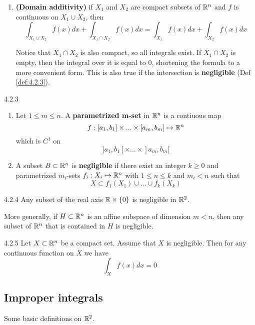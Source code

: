 \begin{enumerate}
    \item \textbf{(Domain additivity)} if $X_1$ and $X_2$ are compact subsets of $\mathbb{R}^n$ and $f$ is continuous on $X_1 \cup X_2$, then
          \[ \int_{X_1 \cup X_2} f(x)dx + \int_{X_1 \cap X_2} f(x)dx = \int_{X_1} f(x) dx + \int_{X_2} f(x)dx \]

          Notice that $X_1 \cap X_2$ is also compact, so all integrals exist.
          If $X_1 \cap X_2$ is empty, then the integral over it is equal to $0$,
          shortening the formula to a more convenient form.
          This is also true if the intersection is \textbf{negligible} (Def \ref{def:4.2.3}).
\end{enumerate}

\begin{definition}{4.2.3}
    \label{def:4.2.3}
    \begin{enumerate}
        \item Let $1 \le m \le n$. A \textbf{parametrized m-set} in $\mathbb{R}^n$ is a contiuous map
              \[ f: [a_1, b_1] \times ... \times [a_m, b_m] \mapsto \mathbb{R}^n \]
              which is $C^1$ on
              \[ ]a_1, b_1[ \times ... \times ]a_m, b_m[ \]
        \item A subset $B \subset \mathbb{R}^n$ is \textbf{negligible} if there exist an integer $k \ge 0$ and parametrized
              $m_i$-sets $f_i: X_i \mapsto \mathbb{R}^n$ with $1 \le n \le k$ and $m_i < n$ such that
              \[ X \subset f_1(X_1) \cup ... \cup f_k(X_k) \]
    \end{enumerate}
\end{definition}

\begin{example}{4.2.4}
    Any subset of the real axis $\mathbb{R} \times \{0\}$ is negligible in $\mathbb{R}^2$.

    More generally, if $H \subset \mathbb{R}^n$ is an affine subspace of dimension $m < n$, then any subset of $\mathbb{R}^n$ that is contained in $H$ is negligible.
\end{example}

\begin{proposition}{4.2.5}
    Let $X \subset \mathbb{R}^n$ be a compact set. Assume that $X$ is negligible.
    Then for any continuous function on $X$ we have
    \[ \int_X f(x)dx = 0 \]
\end{proposition}


\subsection{Improper integrals}
Some basic definitions on $\mathbb{R}^2$.

